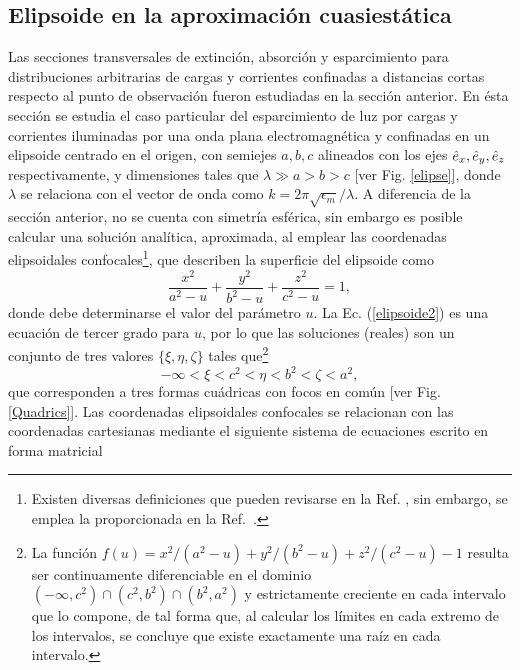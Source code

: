 \hypertarget{elipsoide}{\subsection{Elipsoide en la aproximación cuasiestática}}
Las secciones transversales de extinción, absorción y esparcimiento para distribuciones arbitrarias de cargas y corrientes confinadas a distancias cortas respecto al punto de observación fueron estudiadas en la sección anterior. En ésta sección se estudia el caso particular del esparcimiento de luz por cargas y corrientes iluminadas por una onda plana electromagnética y confinadas en un elipsoide centrado en el origen, con semiejes $a,b,c$ alineados con los ejes $\hat{e}_{x},\hat{e}_{y},\hat{e}_{z}$ respectivamente, y dimensiones tales que $\lambda\gg a>b>c$ [ver Fig. \ref{elipse}], donde $\lambda$ se relaciona con el vector de onda como $k=2\pi\sqrt{\epsilon_m}/\lambda$. A diferencia de la sección anterior, no se cuenta con simetría esférica, sin embargo es posible calcular una solución analítica, aproximada, al emplear las coordenadas elipsoidales confocales\footnote{Existen diversas definiciones que pueden revisarse en la Ref. \cite{ConfocalEllip}, sin embargo, se emplea la proporcionada en la Ref.~\cite{Arfken}. }, que describen la superficie del elipsoide como \cite{ConfocalEllip}
\begin{equation}
	\frac{x^2}{a^2-u}+\frac{y^2}{b^2-u}+\frac{z^2}{c^2-u}=1,
	\label{elipsoide2}
\end{equation}
 donde debe determinarse el valor del parámetro $u$. La Ec. (\ref{elipsoide2}) es una ecuación de tercer grado para $u$, por lo que las soluciones (reales) son un conjunto de tres valores $\{\xi,\eta,\zeta\}$ tales que\footnote{La función $f(u)=x^2/(a^2-u)+y^2/(b^2-u)+z^2/(c^2-u)-1$ resulta ser continuamente diferenciable en el dominio $(-\infty, c^2)\cap (c^2, b^2)\cap (b^2, a^2)$ y estrictamente creciente en cada intervalo que lo compone, de tal forma que, al calcular los límites en cada extremo de los intervalos, se concluye que existe exactamente una raíz en cada intervalo.}
\begin{equation}
	-\infty<\xi<c^2<\eta<b^2<\zeta<a^2,
\end{equation}
que corresponden a tres formas cuádricas con focos en común [ver Fig. \ref{Quadrics}]. Las coordenadas elipsoidales confocales se relacionan con las coordenadas cartesianas mediante el siguiente sistema de ecuaciones escrito en forma matricial
%
